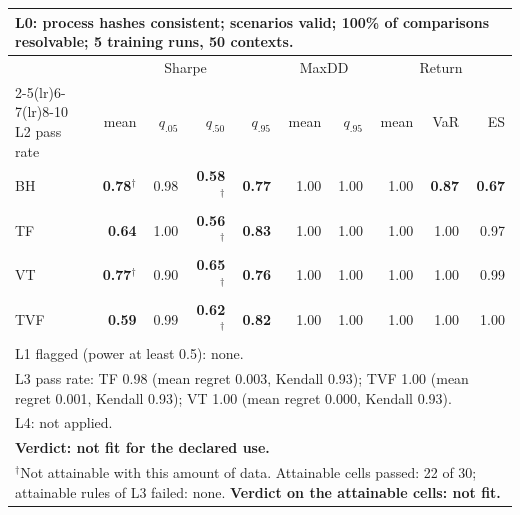\begin{tabular}{lrrrrrrrrr}
\toprule
\multicolumn{10}{p{13.5cm}}{L0: process hashes consistent; scenarios valid; 100\% of comparisons resolvable; 5 training runs, 50 contexts.} \\
\midrule
 & \multicolumn{4}{c}{Sharpe} & \multicolumn{2}{c}{MaxDD} & \multicolumn{3}{c}{Return} \\
\cmidrule(lr){2-5}\cmidrule(lr){6-7}\cmidrule(lr){8-10}
L2 pass rate & mean & $q_{.05}$ & $q_{.50}$ & $q_{.95}$ & mean & $q_{.95}$ & mean & VaR & ES \\
\midrule
BH & \textbf{0.78}$^{\dagger}$ & 0.98 & \textbf{0.58}$^{\dagger}$ & \textbf{0.77} & 1.00 & 1.00 & 1.00 & \textbf{0.87} & \textbf{0.67} \\
TF & \textbf{0.64} & 1.00 & \textbf{0.56}$^{\dagger}$ & \textbf{0.83} & 1.00 & 1.00 & 1.00 & 1.00 & 0.97 \\
VT & \textbf{0.77}$^{\dagger}$ & 0.90 & \textbf{0.65}$^{\dagger}$ & \textbf{0.76} & 1.00 & 1.00 & 1.00 & 1.00 & 0.99 \\
TVF & \textbf{0.59} & 0.99 & \textbf{0.62}$^{\dagger}$ & \textbf{0.82} & 1.00 & 1.00 & 1.00 & 1.00 & 1.00 \\
\midrule
\multicolumn{10}{p{13.5cm}}{L1 flagged (power at least 0.5): none.} \\
\multicolumn{10}{p{13.5cm}}{L3 pass rate: TF 0.98 (mean regret 0.003, Kendall 0.93); TVF 1.00 (mean regret 0.001, Kendall 0.93); VT 1.00 (mean regret 0.000, Kendall 0.93).} \\
\multicolumn{10}{p{13.5cm}}{L4: not applied.} \\
\multicolumn{10}{p{13.5cm}}{\textbf{Verdict: not fit for the declared use.}} \\
\multicolumn{10}{p{13.5cm}}{$^{\dagger}$Not attainable with this amount of data. Attainable cells passed: 22 of 30; attainable rules of L3 failed: none. \textbf{Verdict on the attainable cells: not fit.}} \\
\bottomrule
\end{tabular}
